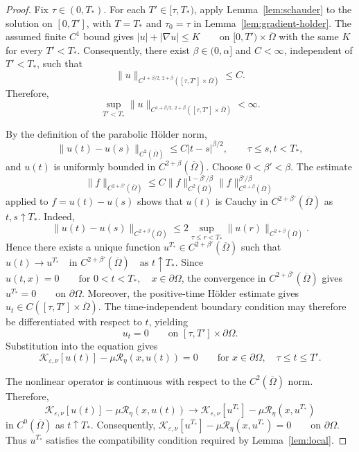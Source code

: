 \documentclass[11pt]{article}
\theoremstyle{remark}
\newcommand{\cT}{\mathcal{R}}
\begin{document}
\begin{proof}
Fix $\tau\in(0,T_*)$. For each $T'\in[\tau,T_*)$, apply
Lemma~\ref{lem:schauder} to the solution on $[0,T']$, with $T=T_*$ and
$\tau_0=\tau$ in Lemma~\ref{lem:gradient-holder}. The assumed finite
$C^1$ bound gives
$|u|+|\nabla u|\leq K
\qquad\text{on }[0,T')\times\overline{\Omega}
$
with the same $K$ for every $T'<T_*$. Consequently, there exist
$\beta\in(0,\alpha]$ and $C<\infty$, independent of $T'<T_*$, such that
\[
\|u\|_{C^{1+\beta/2,\,2+\beta}
([\tau,T']\times\overline{\Omega})}
\leq C.
\]
Therefore,
\[
\sup_{T'<T_*}
\|u\|_{C^{1+\beta/2,\,2+\beta}
([\tau,T']\times\overline{\Omega})}
<\infty.
\]

By the definition of the parabolic H\"older norm,
\[
\|u(t)-u(s)\|_{C^2(\overline{\Omega})}
\leq
C|t-s|^{\beta/2},
\qquad
\tau\leq s,t<T_*,
\]
and $u(t)$ is uniformly bounded in
$C^{2+\beta}(\overline{\Omega})$. Choose
$0<\beta'<\beta$.
The estimate
\[
\|f\|_{C^{2+\beta'}(\overline{\Omega})}
\leq
C
\|f\|_{C^2(\overline{\Omega})}^{1-\beta'/\beta}
\|f\|_{C^{2+\beta}(\overline{\Omega})}^{\beta'/\beta}
\]
applied to $f=u(t)-u(s)$ shows that $u(t)$ is Cauchy in
$C^{2+\beta'}(\overline{\Omega})$ as $t,s\uparrow T_*$. Indeed,
\[
\|u(t)-u(s)\|_{C^{2+\beta}(\overline{\Omega})}
\leq
2\sup_{\tau\leq r<T_*}
\|u(r)\|_{C^{2+\beta}(\overline{\Omega})}.
\]
Hence there exists a unique function
$u^{T_*}\in C^{2+\beta'}(\overline{\Omega})$
such that
$u(t)\longrightarrow u^{T_*}
\quad\text{in }C^{2+\beta'}(\overline{\Omega})
\quad\text{as }t\uparrow T_*$.
Since
$u(t,x)=0
\qquad
\text{for }0<t<T_*,\quad x\in\partial\Omega$, the convergence in $C^{2+\beta'}(\overline{\Omega})$ gives
$u^{T_*}=0
\qquad\text{on }\partial\Omega$. Moreover, the positive-time H\"older estimate gives
$u_t\in C([\tau,T']\times\overline{\Omega})$. The time-independent boundary condition may therefore be differentiated
with respect to $t$, yielding
\[
u_t=0
\qquad\text{on }[\tau,T']\times\partial\Omega.
\]
Substitution into the equation gives
\[
\mathcal{K}_{\varepsilon,\nu}[u(t)]
-\mu\cT_\eta(x,u(t))
=0
\qquad
\text{for }x\in\partial\Omega,\quad
\tau\leq t\leq T'.
\]

The nonlinear operator is continuous with respect to the
$C^2(\overline{\Omega})$ norm. Therefore,
\[
\mathcal{K}_{\varepsilon,\nu}[u(t)]
-\mu\cT_\eta(x,u(t))
\longrightarrow
\mathcal{K}_{\varepsilon,\nu}[u^{T_*}]
-\mu\cT_\eta(x,u^{T_*})
\]
in $C^0(\overline{\Omega})$ as $t\uparrow T_*$. Consequently,
$\mathcal{K}_{\varepsilon,\nu}[u^{T_*}]
-\mu\cT_\eta(x,u^{T_*})
=0
\qquad\text{on }\partial\Omega$.
 Thus $u^{T_*}$ satisfies the compatibility condition required by
Lemma~\ref{lem:local}.


\end{proof}
\end{document}
